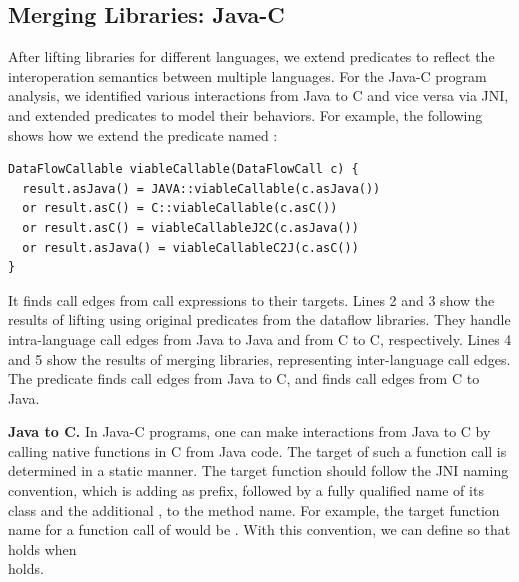 \subsection{Merging Libraries: Java-C}\label{sec:merging}
After lifting libraries for different languages, we extend predicates to
reflect the interoperation semantics between multiple languages.  
For the Java-C program analysis, we identified various interactions from Java
to C and vice versa via JNI, and extended predicates to model their
behaviors.
%
%
For example, the following shows how we extend the predicate
named :
\begin{lstlisting}[style=codeql,xleftmargin=2.5em]
DataFlowCallable viableCallable(DataFlowCall c) {
  result.asJava() = JAVA::viableCallable(c.asJava())
  or result.asC() = C::viableCallable(c.asC())
  or result.asC() = viableCallableJ2C(c.asJava())
  or result.asJava() = viableCallableC2J(c.asC())
}
\end{lstlisting}

\noindent
It finds call edges from call expressions to their targets. 
Lines 2 and 3 show the results of lifting using
original predicates from the dataflow libraries.  
They handle intra-language call edges from Java to Java and from C to C, respectively.
Lines 4 and 5 show the results of merging libraries, representing
inter-language call edges.  The predicate  finds call edges
from Java to C, and  finds call edges from C to Java.

\textbf{Java to C.} In Java-C programs, one can make interactions from Java to
C by calling native functions in C from Java code. 
The target of such a function call is determined in a static manner.
The target function should follow the JNI naming convention, which is adding
 as prefix, followed by a fully qualified name of its class and
the additional \codeql{\_}, to the method name.
For example, the target function name for a function call of 
would be .
With this convention, we can define  so that
 holds when  \\
 holds.


